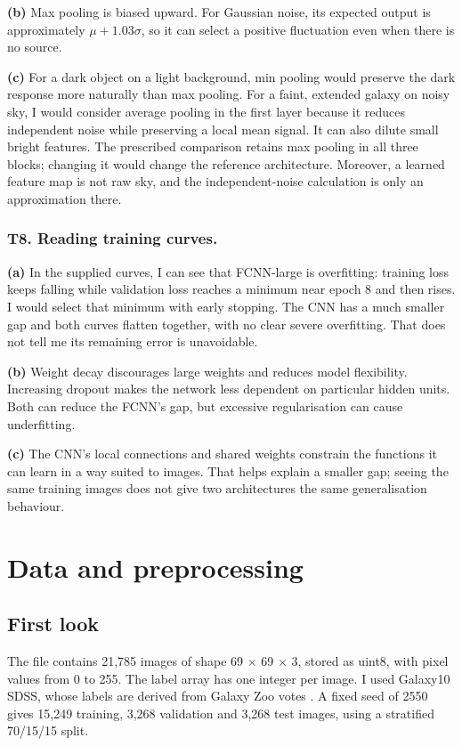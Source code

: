 \documentclass[11pt]{article}
\begin{document}
\textbf{(b)} Max pooling is biased upward. For Gaussian noise, its expected output is approximately $\mu+1.03\sigma$, so it can select a positive fluctuation even when there is no source.

\textbf{(c)} For a dark object on a light background, min pooling would preserve the dark response more naturally than max pooling. For a faint, extended galaxy on noisy sky, I would consider average pooling in the first layer because it reduces independent noise while preserving a local mean signal. It can also dilute small bright features. The prescribed comparison retains max pooling in all three blocks; changing it would change the reference architecture. Moreover, a learned feature map is not raw sky, and the independent-noise calculation is only an approximation there.

\subsubsection*{T8. Reading training curves.}

\textbf{(a)} In the supplied curves, I can see that FCNN-large is overfitting: training loss keeps falling while validation loss reaches a minimum near epoch 8 and then rises. I would select that minimum with early stopping. The CNN has a much smaller gap and both curves flatten together, with no clear severe overfitting. That does not tell me its remaining error is unavoidable.

\textbf{(b)} Weight decay discourages large weights and reduces model flexibility. Increasing dropout makes the network less dependent on particular hidden units. Both can reduce the FCNN's gap, but excessive regularisation can cause underfitting. 

\textbf{(c)} The CNN's local connections and shared weights constrain the functions it can learn in a way suited to images. That helps explain a smaller gap; seeing the same training images does not give two architectures the same generalisation behaviour.


\section{Data and preprocessing}

\subsection{First look}

The file contains 21,785 images of shape 69 \ensuremath{\times} 69 \ensuremath{\times} 3, stored as uint8, with pixel values from 0 to 255. The label array has one integer per image. I used Galaxy10 SDSS, whose labels are derived from Galaxy Zoo votes \cite{ref1}. A fixed seed of 2550 gives 15,249 training, 3,268 validation and 3,268 test images, using a stratified 70/15/15 split.
\end{document}
